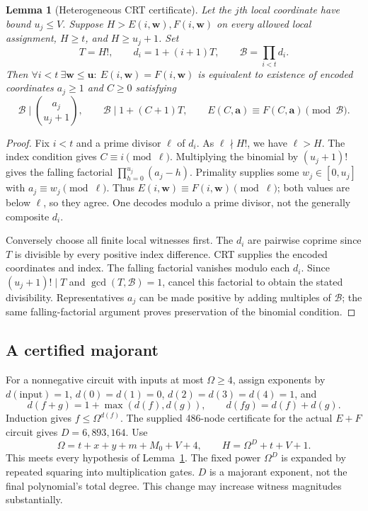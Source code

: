 \documentclass[11pt,letterpaper]{article}
\newtheorem{lemma}[theorem]{Lemma}
\theoremstyle{definition}\newtheorem{definition}[theorem]{Definition}
\theoremstyle{remark}\newtheorem{remark}[theorem]{Remark}
\begin{document}
\begin{lemma}[Heterogeneous CRT certificate]\label{lem:crt}
Let the $j$th local coordinate have bound $u_j\le V$. Suppose
$H>E(i,\mathbf w),F(i,\mathbf w)$ on every allowed local assignment,
$H\ge t$, and $H\ge u_j+1$. Set
\[
 T=H!,\qquad d_i=1+(i+1)T,\qquad \mathcal B=\prod_{i<t}d_i.
\]
Then $\forall i<t\ \exists\mathbf w\le\mathbf u:\ E(i,\mathbf w)=F(i,\mathbf w)$
is equivalent to existence of encoded coordinates $a_j\ge1$ and $C\ge0$
satisfying
\[
 \mathcal B\mid\binom{a_j}{u_j+1},\qquad
 \mathcal B\mid 1+(C+1)T,\qquad
 E(C,\mathbf a)\equiv F(C,\mathbf a)\pmod{\mathcal B}.
\]
\end{lemma}
\begin{proof}
Fix $i<t$ and a prime divisor $\ell$ of $d_i$.
As $\ell\nmid H!$, we have $\ell>H$. The index condition gives
$C\equiv i\pmod\ell$. Multiplying the binomial by $(u_j+1)!$ gives
the falling factorial $\prod_{h=0}^{u_j}(a_j-h)$.
Primality supplies some $w_j\in[0,u_j]$ with
$a_j\equiv w_j\pmod\ell$. Thus $E(i,\mathbf w)\equiv
F(i,\mathbf w)\pmod\ell$; both values are below $\ell$, so they agree.
One decodes modulo a prime divisor, not the generally composite $d_i$.

Conversely choose all finite local witnesses first. The $d_i$ are
pairwise coprime since $T$ is divisible by every positive index
difference. CRT supplies the encoded coordinates and index.
The falling factorial vanishes modulo each $d_i$. Since
$(u_j+1)!\mid T$ and $\gcd(T,\mathcal B)=1$, cancel this factorial
to obtain the stated divisibility. Representatives $a_j$ can be made
positive by adding multiples of $\mathcal B$; the same falling-factorial
argument proves preservation of the binomial condition.
\end{proof}

\subsection{A certified majorant}

For a nonnegative circuit with inputs at most $\Omega\ge4$, assign
exponents by $d(\text{input})=1$, $d(0)=d(1)=0$,
$d(2)=d(3)=d(4)=1$, and
\[
 d(f+g)=1+\max(d(f),d(g)),\qquad d(fg)=d(f)+d(g).
\]
Induction gives $f\le\Omega^{d(f)}$. The supplied 486-node certificate
for the actual $E+F$ circuit gives $D=6,893,164$.
Use
\[
 \Omega=t+x+y+m+M_0+V+4,\qquad H=\Omega^D+t+V+1.
\]
This meets every hypothesis of Lemma~\ref{lem:crt}. The fixed power
$\Omega^D$ is expanded by repeated squaring into multiplication gates.
$D$ is a majorant exponent, not the final polynomial's total degree.
This change may increase witness magnitudes substantially.
\end{document}

